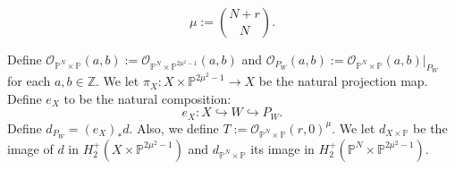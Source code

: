 \documentclass[10pt,a4paper]{amsart}
\newcommand{\bP}{\mathbb{P}}
\newcommand{\bZ}{\mathbb{Z}}
\newcommand{\calO}{\mathcal{O}}
\begin{document}
\begin{equation} \label{eqndefnofmu}
	\mu := {N + r \choose N}.
\end{equation}

\begin{defn} \label{defnprojectionmapandex}
	Define
	$\calO_{\bP^N \times \bP}(a,b) := \calO_{\bP^N \times \bP^{2\mu^2-1}}(a,b)$
	and $\calO_{P_W}(a,b) := \calO_{\bP^N \times \bP}(a,b)|_{P_W}$
	for each $a,b \in \bZ$.
	We let $\pi_X  : X \times \bP^{2\mu^2-1} \to X$ be the natural projection map.
	Define $e_X$ to be the natural composition:
	\begin{equation}
		e_X : X \hookrightarrow W \hookrightarrow P_W.
	\end{equation}
	Define $d_{P_W} = (e_X)_*d$.
	Also, we define $T := \calO_{\bP^N \times \bP}(r,0)^\mu$.
	We let
	$d_{X \times \bP}$ be the image of $d$ in $H_2^+(X \times \bP^{2\mu^2-1})$
	and $d_{\bP^N \times \bP}$ its image in $H_2^+(\bP^N \times \bP^{2\mu^2-1})$.
\end{defn}
\end{document}
